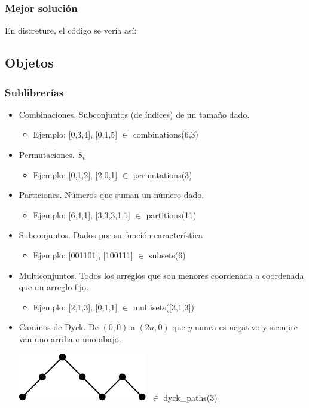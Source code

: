\documentclass[spanish,professionalfonts]{beamer}
\def\tcb#1{\textcolor{MyBlue}{#1}}
\begin{document}
\begin{frame}\frametitle{Mejor solución}
  En discreture, el código se vería así:
  \codethree
\end{frame}


\subsection{Objetos}
\begin{frame}\frametitle{Sublibrerías}
  \begin{itemize}
    \item \tcb{Combinaciones}. Subconjuntos (de índices) de un tamaño dado.
    \begin{itemize}
      \item  Ejemplo: [0,3,4], [0,1,5] $\in$ combinations(6,3) \pause
    \end{itemize}
    \item \tcb{Permutaciones}. $S_n$
    \begin{itemize}
        \item  Ejemplo: [0,1,2], [2,0,1] $\in$ permutations(3) \pause
    \end{itemize}
    \item \tcb{Particiones}. Números que suman un número dado.
    \begin{itemize}
        \item  Ejemplo: [6,4,1], [3,3,3,1,1] $\in$ partitions(11) \pause
    \end{itemize}
    \item \tcb{Subconjuntos}. Dados por su función característica
    \begin{itemize}
        \item  Ejemplo: [001101], [100111] $\in$ subsets(6) \pause
    \end{itemize}
    \item \tcb{Multiconjuntos}. Todos los arreglos que son menores coordenada a coordenada que un arreglo fijo.
    \begin{itemize}
        \item  Ejemplo: [2,1,3], [0,1,1] $\in$ multisets([3,1,3]) \pause
    \end{itemize}
    \item \tcb{Caminos de Dyck}. De $(0,0)$ a $(2n,0)$ que $y$ nunca es negativo y siempre van uno arriba o uno abajo.
    \begin{center}
      \includegraphics[scale=0.6]{./dyck.pdf} $\ \in$ dyck\_paths(3)
    \end{center} \pause


\end{itemize}
\end{frame}
\end{document}
